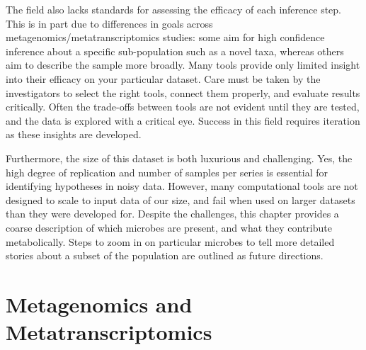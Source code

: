 The field also lacks standards for assessing the efficacy of each inference step.
This is in part due to differences in goals across metagenomics/metatranscriptomics studies: some aim for high confidence inference about a specific sub-population such as a novel taxa, whereas others aim to describe the sample more broadly.
Many tools provide only limited insight into their efficacy on your particular dataset.
Care must be taken by the investigators to select the right tools, connect them properly, and evaluate results critically.
Often the trade-offs between tools are not evident until they are tested, and the data is explored with a critical eye.
Success in this field requires iteration as these insights are developed.

Furthermore, the size of this dataset is both luxurious and challenging.
Yes, the high degree of replication and number of samples per series is essential for identifying hypotheses in noisy data.
However, many computational tools are not designed to scale to input data of our size, and fail when used on larger datasets than they were developed for.
Despite the challenges, this chapter provides a coarse description of which microbes are present, and what they contribute metabolically.
Steps to zoom in on particular microbes to tell more detailed stories about a subset of the population are outlined as future directions.


\section{Metagenomics and Metatranscriptomics}

